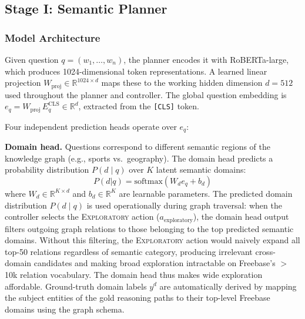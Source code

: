 \documentclass[10pt,conference]{IEEEtran}
\begin{document}
\subsection{Stage I: Semantic Planner}

\subsubsection{Model Architecture}
\label{sec:stage1arch}

Given question $q=(w_1,\dots,w_n)$, the planner encodes it with RoBERTa-large, which produces 1024-dimensional token representations. A learned linear projection $W_{\text{proj}} \in \mathbb{R}^{1024 \times d}$ maps these to the working hidden dimension $d{=}512$ used throughout the planner and controller. The global question embedding is $e_q = W_{\text{proj}}\,E_q^{\text{CLS}} \in \mathbb{R}^{d}$, extracted from the \texttt{[CLS]} token.

Four independent prediction heads operate over $e_q$:

\textbf{Domain head.} Questions correspond to different semantic regions of the knowledge graph (e.g., sports vs.~geography). The domain head predicts a probability distribution $P(d \mid q)$ over $K$ latent semantic domains:
\begin{equation}
P(d|q) = \text{softmax}(W_d e_q + b_d)
\end{equation}
where $W_d \in \mathbb{R}^{K \times d}$ and $b_d \in \mathbb{R}^{K}$ are learnable parameters. The predicted domain distribution $P(d \mid q)$ is used operationally during graph traversal: when the controller selects the \textsc{Exploratory} action ($a_{\text{exploratory}}$), the domain head output filters outgoing graph relations to those belonging to the top predicted semantic domains. Without this filtering, the \textsc{Exploratory} action would naively expand all top-50 relations regardless of semantic category, producing irrelevant cross-domain candidates and making broad exploration intractable on Freebase's $>$10k relation vocabulary. The domain head thus makes wide exploration affordable. Ground-truth domain labels $y^d$ are automatically derived by mapping the subject entities of the gold reasoning paths to their top-level Freebase domains using the graph schema.
\end{document}
